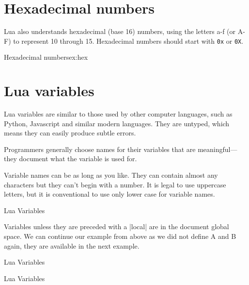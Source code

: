 \section{Hexadecimal numbers}
Lua also understands hexadecimal (base 16) numbers, using the letters
a-f (or A-F) to represent 10 through 15. Hexadecimal numbers should start with \texttt{0x} or \texttt{0X}.

\begin{texexample}{Hexadecimal numbers}{ex:hex}
\end{texexample}


\section{Lua variables}

Lua variables are similar to those used by other computer languages, such as Python, Javascript and similar modern languages. They are untyped, which means they can easily produce subtle errors.

Programmers generally choose names for their variables that are meaningful—they document what the variable is used for.

Variable names can be as long as you like. They can contain almost any characters  but they can’t begin with a number. It is legal to use uppercase letters, but it is conventional to use only lower case for variable names.

\begin{texexample}{Lua Variables}{}
\end{texexample}

Variables unless they are preceded with a |local| are in the document global space. We can continue our example from above as we did not define A and B again, they are available in the next example.

\begin{texexample}{Lua Variables}{}
\end{texexample}

\begin{texexample}{Lua Variables}{}

\def\abadd#1#2{%
  \luadirect{
     A = #1 + #2
     tex.print(A)}
}

\abadd{100}{925.56}
\end{texexample}


